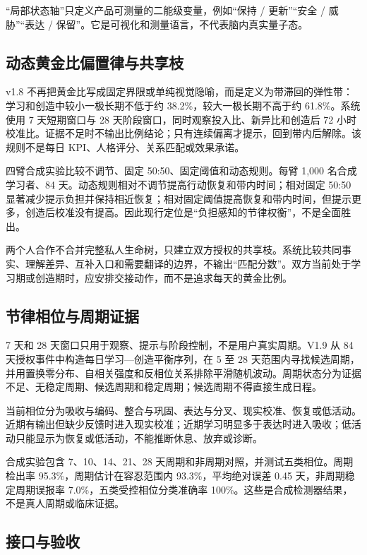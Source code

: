 \documentclass[UTF8,a4paper,11pt]{ctexart}
\begin{document}
“局部状态轴”只定义产品可测量的二能级变量，例如“保持 / 更新”“安全 / 威胁”“表达 / 保留”。它是可视化和测量语言，不代表脑内真实量子态。

\subsection{动态黄金比偏置律与共享枝}

v1.8 不再把黄金比写成固定界限或单纯视觉隐喻，而是定义为带滞回的弹性带：学习和创造中较小一极长期不低于约 38.2\%，较大一极长期不高于约 61.8\%。系统使用 7 天短期窗口与 28 天阶段窗口，同时观察投入比、新异比和创造后 72 小时校准比。证据不足时不输出比例结论；只有连续偏离才提示，回到带内后解除。该规则不是每日 KPI、人格评分、关系匹配或效果承诺。

四臂合成实验比较不调节、固定 50:50、固定阈值和动态规则。每臂 1,000 名合成学习者、84 天。动态规则相对不调节提高行动恢复和带内时间；相对固定 50:50 显著减少提示负担并保持相近恢复；相对固定阈值提高恢复和带内时间，但提示更多，创造后校准没有提高。因此现行定位是“负担感知的节律权衡”，不是全面胜出。

两个人合作不合并完整私人生命树，只建立双方授权的共享枝。系统比较共同事实、理解差异、互补入口和需要翻译的边界，不输出“匹配分数”。双方当前处于学习期或创造期时，应安排交接动作，而不是追求每天的黄金比例。

\subsection{节律相位与周期证据}

7 天和 28 天窗口只用于观察、提示与阶段控制，不是用户真实周期。V1.9 从 84 天授权事件中构造每日学习—创造平衡序列，在 5 至 28 天范围内寻找候选周期，并用置换零分布、自相关强度和反相位关系排除平滑随机波动。周期状态分为证据不足、无稳定周期、候选周期和稳定周期；候选周期不得直接生成日程。

当前相位分为吸收与编码、整合与巩固、表达与分叉、现实校准、恢复或低活动。近期有输出但缺少反馈时进入现实校准；近期学习明显多于表达时进入吸收；低活动只能显示为恢复或低活动，不能推断休息、放弃或诊断。

合成实验包含 7、10、14、21、28 天周期和非周期对照，并测试五类相位。周期检出率 95.3\%，周期估计在容忍范围内 93.3\%，平均绝对误差 0.45 天，非周期稳定周期误报率 7.0\%，五类受控相位分类准确率 100\%。这些是合成检测器结果，不是真人周期或临床证据。


\subsection{接口与验收}
\end{document}
